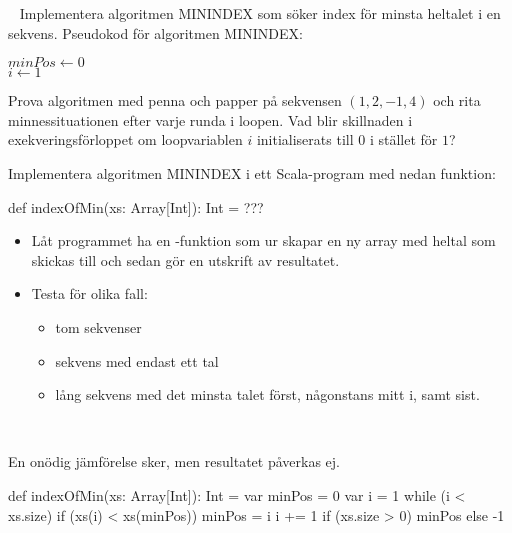 \QUESTBEGIN

\Task \label{task:minindex} \what~  Implementera algoritmen MININDEX som söker index för minsta heltalet i en sekvens. Pseudokod för algoritmen MININDEX:

\begin{algorithm}[H]

 $minPos \leftarrow 0 $\\
 $i \leftarrow 1$ \\
\end{algorithm}

\Subtask Prova algoritmen med penna och papper på sekvensen $(1, 2, -1, 4)$ och rita minnessituationen efter varje runda i loopen. Vad blir skillnaden i exekveringsförloppet om loopvariablen $i$  initialiserats till $0$ i stället för $1$?

\Subtask Implementera algoritmen MININDEX i ett Scala-program med nedan funktion:
\begin{Code}
def indexOfMin(xs: Array[Int]): Int = ???
\end{Code}
\begin{itemize}
  \item Låt programmet ha en -funktion som ur  skapar en ny array med heltal som skickas till  och sedan gör en utskrift av resultatet.
  \item Testa för olika fall:
  \begin{itemize}
    \item tom sekvenser
    \item sekvens med endast ett tal
    \item lång sekvens med det minsta talet först, någonstans mitt i, samt sist.
  \end{itemize}
\end{itemize}


\SOLUTION

\TaskSolved \what~

\SubtaskSolved En onödig jämförelse sker, men resultatet påverkas ej.

\SubtaskSolved

\begin{Code}
def indexOfMin(xs: Array[Int]): Int = {
  var minPos = 0
  var i = 1
  while (i < xs.size) {
    if (xs(i) < xs(minPos)) minPos = i
    i += 1
  }
  if (xs.size > 0) minPos else -1
}
\end{Code}


